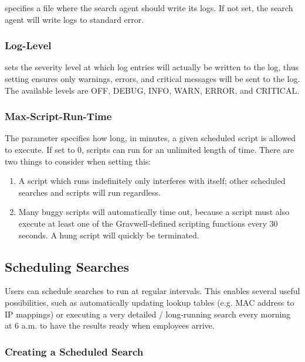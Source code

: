  specifies a file where the search agent should write its
logs. If not set, the search agent will write logs to standard error.

\subsubsection{Log-Level}

 sets the severity level at which log entries will actually be
written to the log, thus setting  ensures only warnings,
errors, and critical messages will be sent to the log. The available
levels are OFF, DEBUG, INFO, WARN, ERROR, and CRITICAL.

\subsubsection{Max-Script-Run-Time}

The  parameter specifies how long, in minutes, a
given scheduled script is allowed to execute. If set to 0, scripts can
run for an unlimited length of time. There are two things to consider
when setting this:

\begin{enumerate}
\tightlist
\item
  A script which runs indefinitely only interferes with itself; other
  scheduled searches and scripts will run regardless.
\item
  Many buggy scripts will automatically time out, because a script must
  also execute at least one of the Gravwell-defined
  scripting functions every 30 seconds. A hung script will quickly
  be terminated.
\end{enumerate}


\subsection{Scheduling Searches}

Users can schedule searches to run at regular intervals. This enables
several useful possibilities, such as automatically updating lookup
tables (e.g. MAC address to IP mappings) or executing a very detailed /
long-running search every morning at 6 a.m. to have the results ready
when employees arrive.

\subsubsection{Creating a Scheduled Search}

